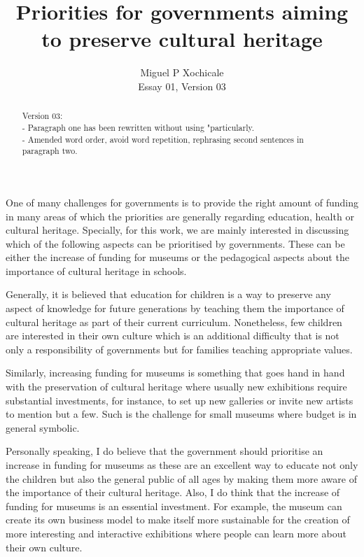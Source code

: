 \documentclass[10pt]{article}
\title{Priorities for governments aiming to preserve cultural heritage}
\author{Miguel P Xochicale\\
Essay 01, Version 03}
\date{ }
\begin{document}
\maketitle
\thispagestyle{empty} %



\begin{abstract}
Version 03: \\
- Paragraph one has been rewritten without using "particularly. \\
- Amended word order, avoid word repetition, rephrasing second sentences in paragraph two.
\end{abstract}

One of many challenges for governments is to provide the right amount of funding 
in many areas of which the priorities are generally regarding education, health or 
cultural heritage. 
Specially, for this work, we are mainly interested in discussing which of the 
following aspects can be prioritised by governments. These can be either the increase of funding for museums 
or the pedagogical aspects about the importance of cultural heritage in schools.

Generally, it is believed that education for children is a way to preserve any 
aspect of knowledge for future generations by teaching them the importance of cultural 
heritage as part of their current curriculum. 
Nonetheless, few children are interested in their own culture which is an additional difficulty 
that is not only a responsibility of governments but for families teaching appropriate values.


Similarly, increasing funding for museums is something that goes hand in hand with 
the preservation of cultural heritage where usually new exhibitions require 
substantial investments, for instance, to set up new galleries or invite new artists
to mention but a few. Such is the challenge for small museums where budget is in
general symbolic.

Personally speaking, I do believe that the government should prioritise an increase 
in funding for museums as these are an excellent way to educate not only the children
but also the general public of all ages by making them more aware of the importance of  
their cultural heritage. 
Also, I do think that the increase of funding for museums is an essential investment.
For example, the museum can create its own business model to make itself 
more sustainable for the creation of more interesting
and interactive exhibitions where people can learn more about their own culture.
\end{document}
